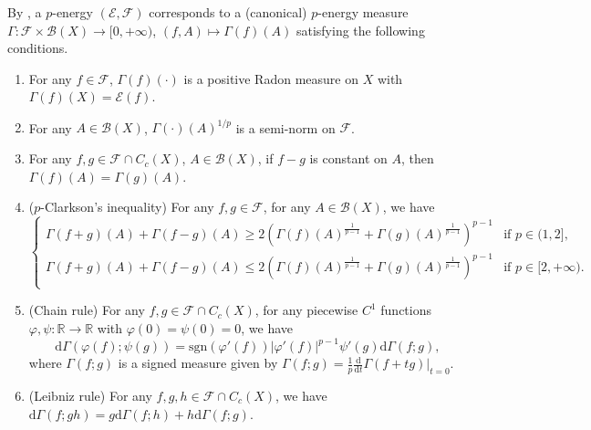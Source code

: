 \documentclass[11pt,a4paper]{article}
\numberwithin{equation}{section}
\theoremstyle{plain}
\theoremstyle{definition}
\begin{document}
By \cite[Theorem 2.4]{Sas26}, a $p$-energy $(\mathcal{E},\mathcal{F})$ corresponds to a (canonical) $p$-energy measure $\Gamma:\mathcal{F}\times\mathcal{B}(X)\to[0,+\infty)$, $(f,A)\mapsto\Gamma(f)(A)$ satisfying the following conditions.
\begin{enumerate}[label=(\alph*),ref=(\alph*)]
\item\label{item_meas1} For any $f\in\mathcal{F}$, $\Gamma(f)(\cdot)$ is a positive Radon measure on $X$ with $\Gamma(f)(X)=\mathcal{E}(f)$.
\item\label{item_meas2} For any $A\in\mathcal{B}(X)$, $\Gamma(\cdot)(A)^{1/p}$ is a semi-norm on $\mathcal{F}$.
\item\label{item_meas3} For any $f,g\in\mathcal{F}\cap C_c(X)$, $A\in\mathcal{B}(X)$, if $f-g$ is constant on $A$, then $\Gamma(f)(A)=\Gamma(g)(A)$.
\item\label{item_meas4} ($p$-Clarkson's inequality) For any $f,g\in\mathcal{F}$, for any $A\in\mathcal{B}(X)$, we have
\begin{equation*}
\begin{cases}
\Gamma(f+g)(A)+\Gamma(f-g)(A)\ge2 \left(\Gamma(f)(A)^{\frac{1}{p-1}}+\Gamma(g)(A)^{\frac{1}{p-1}}\right)^{p-1}&\text{if }p\in(1,2],\\
\Gamma(f+g)(A)+\Gamma(f-g)(A)\le2 \left(\Gamma(f)(A)^{\frac{1}{p-1}}+\Gamma(g)(A)^{\frac{1}{p-1}}\right)^{p-1}&\text{if }p\in[2,+\infty).\\
\end{cases}
\end{equation*}
\item\label{item_meas5} (Chain rule) For any $f,g\in\mathcal{F}\cap C_c(X)$, for any piecewise $C^1$ functions $\varphi,\psi:\mathbb{R}\to\mathbb{R}$ with $\varphi(0)=\psi(0)=0$, we have
$$\mathrm{d}\Gamma\left(\varphi(f);\psi(g)\right)=\mathrm{sgn}(\varphi'(f))|\varphi'(f)|^{p-1}\psi'(g)\mathrm{d}\Gamma(f;g),$$
where $\Gamma(f;g)$ is a signed measure given by $\Gamma(f;g)=\frac{1}{p}\frac{\mathrm{d}}{\mathrm{d}t}\Gamma(f+tg)|_{t=0}$.
\item\label{item_meas6} (Leibniz rule) For any $f,g,h\in \mathcal{F}\cap C_c(X)$, we have $\mathrm{d}\Gamma(f;gh)=g \mathrm{d}\Gamma(f;h)+h \mathrm{d}\Gamma(f;g)$.
\end{enumerate}
\end{document}
